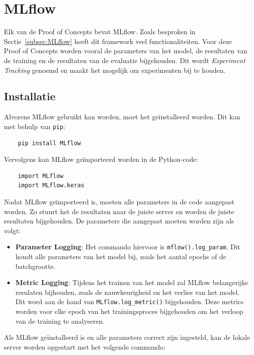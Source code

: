 
\section{MLflow}

Elk van de Proof of Concepts bevat MLflow. Zoals besproken in Sectie~\ref{subsec:MLflow} heeft dit framework veel functionaliteiten. Voor deze Proof of Concepts worden vooral de parameters van het model, de resultaten van de training en de resultaten van de evaluatie bijgehouden. Dit wordt \textit{Experiment Tracking} genoemd en maakt het mogelijk om experimenten bij te houden.

\subsection{Installatie}

Alvorens MLflow gebruikt kan worden, moet het geïnstalleerd worden. Dit kan met behulp van \texttt{pip}:

\begin{verbatim}
    pip install MLflow
\end{verbatim}

Vervolgens kan MLflow geïmporteerd worden in de Python-code:

\begin{verbatim}
    import MLflow
    import MLflow.keras
\end{verbatim}

Nadat MLflow geïmporteerd is, moeten alle parameters in de code aangepast worden. Zo stuurt het de resultaten naar de juiste server en worden de juiste resultaten bijgehouden. De parameters die aangepast moeten worden zijn als volgt:

\begin{itemize}
    \item \textbf{Parameter Logging}: Het commando hiervoor is \texttt{mflow().log\_param}. Dit houdt alle parameters van het model bij, zoals het aantal epochs of de batchgrootte.
    \item \textbf{Metric Logging}: Tijdens het trainen van het model zal MLflow belangerijke resulaten bijhouden, zoals de nauwkeurigheid en het verlies van het model. Dit word aan de hand van \texttt{MLflow.log\_metric()} bijgehouden. Deze metrics worden voor elke epoch van het trainingsproces bijgehouden om het verloop van de training te analyseren.
\end{itemize}

Als MLflow geïnstalleerd is en alle parameters correct zijn ingesteld, kan de lokale server worden opgestart met het volgende commando:

